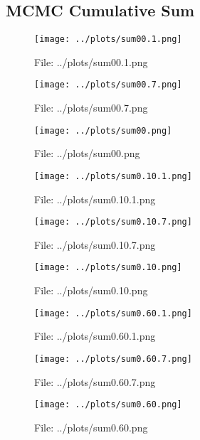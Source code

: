 \documentclass[a4paper, 11pt]{report}
\let\Oldsubsection\subsection
\renewcommand{\subsection}{\FloatBarrier\Oldsubsection}
\begin{document}
\subsection{MCMC Cumulative Sum}
\begin{figure}[h!] \caption{File: ../plots/sum00.1.png} \texttt{[image: ../plots/sum00.1.png]} \end{figure}
\begin{figure}[h!] \caption{File: ../plots/sum00.7.png} \texttt{[image: ../plots/sum00.7.png]} \end{figure}
\begin{figure}[h!] \caption{File: ../plots/sum00.png} \texttt{[image: ../plots/sum00.png]} \end{figure}
\begin{figure}[h!] \caption{File: ../plots/sum0.10.1.png} \texttt{[image: ../plots/sum0.10.1.png]} \end{figure}
\begin{figure}[h!] \caption{File: ../plots/sum0.10.7.png} \texttt{[image: ../plots/sum0.10.7.png]} \end{figure}
\begin{figure}[h!] \caption{File: ../plots/sum0.10.png} \texttt{[image: ../plots/sum0.10.png]} \end{figure}
\begin{figure}[h!] \caption{File: ../plots/sum0.60.1.png} \texttt{[image: ../plots/sum0.60.1.png]} \end{figure}
\begin{figure}[h!] \caption{File: ../plots/sum0.60.7.png} \texttt{[image: ../plots/sum0.60.7.png]} \end{figure}
\begin{figure}[h!] \caption{File: ../plots/sum0.60.png} \texttt{[image: ../plots/sum0.60.png]} \end{figure}
\end{document}
